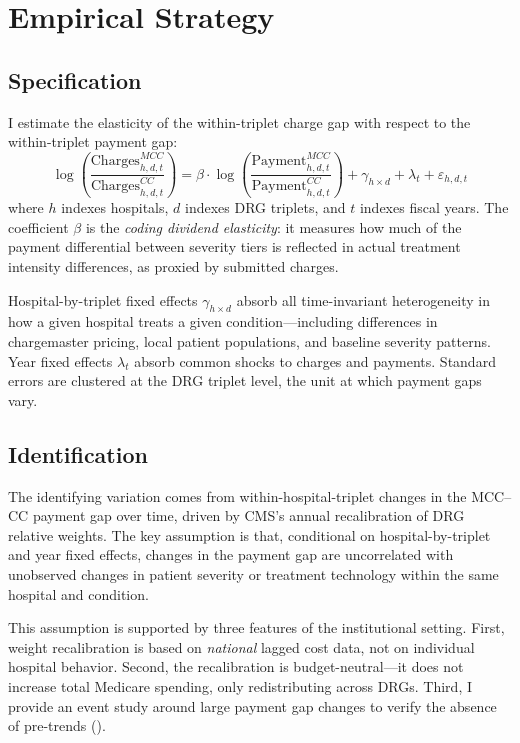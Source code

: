 \documentclass[12pt]{article}
\begin{document}
\section{Empirical Strategy}
\label{sec:strategy}

\subsection{Specification}

I estimate the elasticity of the within-triplet charge gap with respect to the within-triplet payment gap:
\begin{equation}
  \log\left(\frac{\text{Charges}_{h,d,t}^{MCC}}{\text{Charges}_{h,d,t}^{CC}}\right) = \beta \cdot \log\left(\frac{\text{Payment}_{h,d,t}^{MCC}}{\text{Payment}_{h,d,t}^{CC}}\right) + \gamma_{h \times d} + \lambda_t + \varepsilon_{h,d,t}
  \label{eq:main}
\end{equation}
where $h$ indexes hospitals, $d$ indexes DRG triplets, and $t$ indexes fiscal years. The coefficient $\beta$ is the \textit{coding dividend elasticity}: it measures how much of the payment differential between severity tiers is reflected in actual treatment intensity differences, as proxied by submitted charges.

Hospital-by-triplet fixed effects $\gamma_{h \times d}$ absorb all time-invariant heterogeneity in how a given hospital treats a given condition---including differences in chargemaster pricing, local patient populations, and baseline severity patterns. Year fixed effects $\lambda_t$ absorb common shocks to charges and payments. Standard errors are clustered at the DRG triplet level, the unit at which payment gaps vary.

\subsection{Identification}

The identifying variation comes from within-hospital-triplet changes in the MCC--CC payment gap over time, driven by CMS's annual recalibration of DRG relative weights. The key assumption is that, conditional on hospital-by-triplet and year fixed effects, changes in the payment gap are uncorrelated with unobserved changes in patient severity or treatment technology within the same hospital and condition.

This assumption is supported by three features of the institutional setting. First, weight recalibration is based on \textit{national} lagged cost data, not on individual hospital behavior. Second, the recalibration is budget-neutral---it does not increase total Medicare spending, only redistributing across DRGs. Third, I provide an event study around large payment gap changes to verify the absence of pre-trends ().
\end{document}
